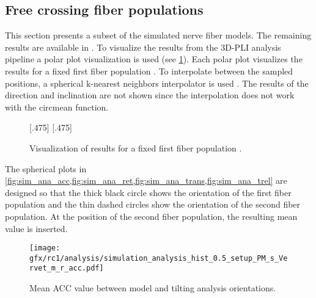 \subsection{Free crossing fiber populations}
\label{sec:resFreeCross}
% 
%
This section presents a subset of the simulated nerve fiber models.
The remaining results are available in \dummy{}.
To visualize the results from the \ac{3D-PLI} analysis pipeline a polar plot visualization is used (see \cref{fig:simModelSphereSample}).
Each polar plot visualizes the results for a fixed first fiber population \popa{}.
To interpolate between the sampled positions, a spherical k-nearest neighbors interpolator is used \cite{DBLP:journals/corr/abs-1910-00704}.
The results of the direction and inclination are not shown since the interpolation does not work with the circmean function.
% 
\begin{figure}[t]
\centering
\setlength{\tikzwidth}{0.40\textwidth}
[.475\textwidth]{}
\hfill
{}
[.475\textwidth]{}
\caption{Visualization of results for a fixed first fiber population \popa{}.}
\label{fig:simModelSphereSample}
\end{figure}
%
The spherical plots in \cref{fig:sim_ana_acc,fig:sim_ana_ret,fig:sim_ana_trans,fig:sim_ana_trel} are designed so that the thick black circle shows the orientation of the first fiber population and the thin dashed circles show the orientation of the second fiber population.
At the position of the second fiber population, the resulting mean value is inserted.
%
%
%
\begin{figure}[!p]
\centering
\texttt{[image: gfx/rc1/analysis/simulation\_analysis\_hist\_0.5\_setup\_PM\_s\_Vervet\_m\_r\_acc.pdf]}
\caption{Mean \ac{ACC} value between model and tilting analysis orientations. }
\label{fig:sim_ana_acc}
\end{figure}
%
